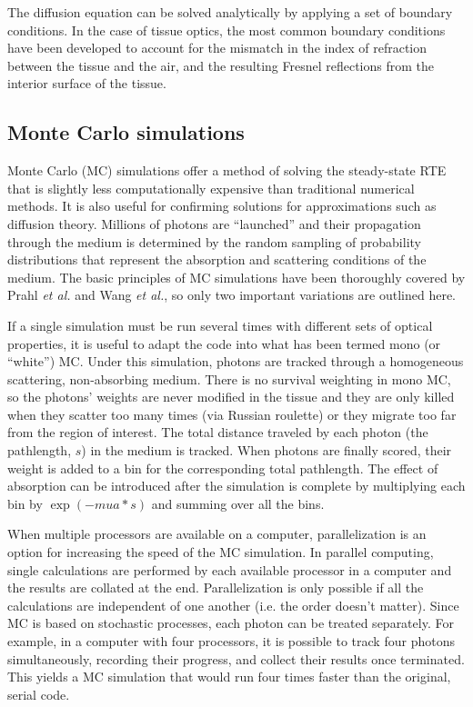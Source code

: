 The diffusion equation can be solved analytically by applying a set of boundary conditions. In the case of tissue optics, the most common boundary conditions have been developed to account for the mismatch in the index of refraction between the tissue and the air, and the resulting Fresnel reflections from the interior surface of the tissue.

\subsection{Monte Carlo simulations}
\label{sec:mc}
Monte Carlo (MC) simulations offer a method of solving the steady-state RTE that is slightly less computationally expensive than traditional numerical methods. It is also useful for confirming solutions for approximations such as diffusion theory. Millions of photons are ``launched'' and their propagation through the medium is determined by the random sampling of probability distributions that represent the absorption and scattering conditions of the medium. The basic principles of MC simulations have been thoroughly covered by Prahl \emph{et al.}\cite{Prahl1989} and Wang \emph{et al.},\cite{Wang1995} so only two important variations are outlined here.

If a single simulation must be run several times with different sets of optical properties, it is useful to adapt the code into what has been termed mono (or “white”) MC.\cite{Kienle1996a,Alerstam2013} Under this simulation, photons are tracked through a homogeneous scattering, non-absorbing medium. There is no survival weighting in mono MC, so the photons' weights are never modified in the tissue and they are only killed when they scatter too many times (via Russian roulette) or they migrate too far from the region of interest. The total distance traveled by each photon (the pathlength, $s$) in the medium is tracked. When photons are finally scored, their weight is added to a bin for the corresponding total pathlength. The effect of absorption can be introduced after the simulation is complete by multiplying each bin by $\exp(-mua*s)$ and summing over all the bins.

When multiple processors are available on a computer, parallelization is an option for increasing the speed of the MC simulation. In parallel computing, single calculations are performed by each available processor in a computer and the results are collated at the end. Parallelization is only possible if all the calculations are independent of one another (i.e. the order doesn't matter). Since MC is based on stochastic processes, each photon can be treated separately. For example, in a computer with four processors, it is possible to track four photons simultaneously, recording their progress, and collect their results once terminated. This yields a MC simulation that would run four times faster than the original, serial code.

